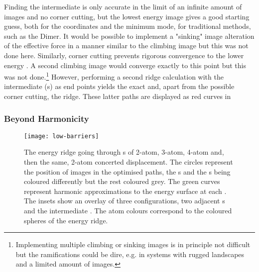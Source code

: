 Finding the intermediate  is only accurate in the limit of an infinite amount of images and no corner cutting, but the lowest energy image gives a good starting guess, both for the coordinates and the minimum mode, for traditional  methods, such as the Dimer.
It would be possible to implement a "sinking" image alteration of the effective force in a manner similar to the climbing image but this was not done here.
Similarly, corner cutting prevents rigorous convergence to the lower energy .
A second climbing image would converge exactly to this point but this was not done.\footnote{Implementing multiple climbing or sinking images is in principle not difficult but the ramifications could be dire, e.g. in systems with rugged landscapes and a limited amount of images.}
However, performing a second ridge calculation with the intermediate (s) as end points yields the exact  and, apart from the possible corner cutting, the ridge.
These latter paths are displayed as red curves in 

\subsubsection{Beyond Harmonicity}
\begin{figure}[hp]
\begin{center}
\texttt{[image: low-barriers]}
    \parbox{0.85\linewidth}{
\caption{
The energy ridge going through s of 2-atom, 3-atom, 4-atom and, then the same, 2-atom concerted displacement.%
The circles represent the position of images in the optimised paths, the s and the s being coloured differently but the rest coloured grey.
The green curves represent harmonic approximations to the energy surface at each .
The insets show an overlay of three configurations, two adjacent s and the intermediate .
The atom colours correspond to the coloured spheres of the energy ridge.
}
\label{fig:low-barriers}
}
\end{center}
\end{figure}

